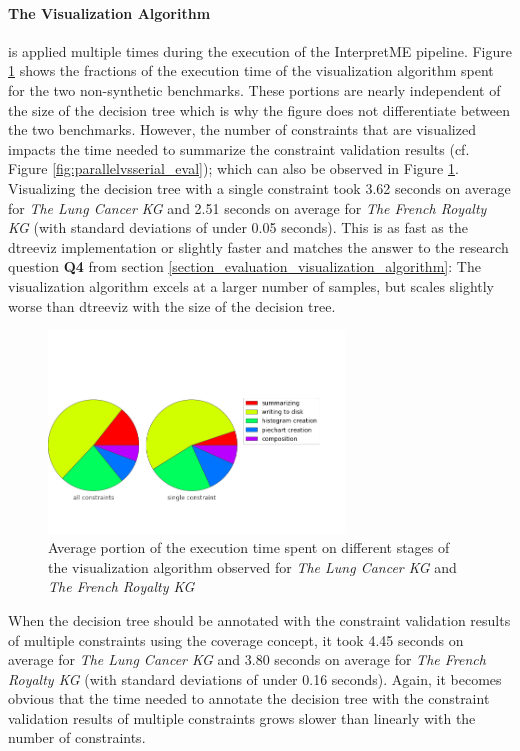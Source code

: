 \paragraph{The Visualization Algorithm} is applied multiple times during the execution of the InterpretME pipeline. Figure \ref{fig:fractions_visualization_algorithm} shows the fractions of the execution time of the visualization algorithm spent for the two non-synthetic benchmarks. These portions are nearly independent of the size of the decision tree which is why the figure does not differentiate between the two benchmarks. However, the number of constraints that are visualized impacts the time needed to summarize the constraint validation results (cf. Figure \ref{fig:parallelvsserial_eval}); which can also be observed in Figure \ref{fig:fractions_visualization_algorithm}. Visualizing the decision tree with a single constraint took 3.62 seconds on average for \textit{The Lung Cancer KG} and 2.51 seconds on average for \textit{The French Royalty KG} (with standard deviations of under 0.05 seconds). This is as fast as the dtreeviz implementation or slightly faster and matches the answer to the research question \textbf{Q4} from section \ref{section_evaluation_visualization_algorithm}: The visualization algorithm excels at a larger number of samples, but scales slightly worse than dtreeviz with the size of the decision tree. 
\begin{figure}
    \centering
    \includegraphics[width=0.7\textwidth,trim=0 50 40 100,clip]{images/evaluation/overall_viz_distribution_separate.png}
    \caption{Average portion of the execution time spent on different stages of the visualization algorithm observed for \textit{The Lung Cancer KG} and \textit{The French Royalty KG}}
    \label{fig:fractions_visualization_algorithm}
\end{figure}
When the decision tree should be annotated with the constraint validation results of multiple constraints using the coverage concept, it took 4.45 seconds on average for \textit{The Lung Cancer KG} and 3.80 seconds on average for \textit{The French Royalty KG} (with standard deviations of under 0.16 seconds). Again, it becomes obvious that the time needed to annotate the decision tree with the constraint validation results of multiple constraints grows slower than linearly with the number of constraints. 

